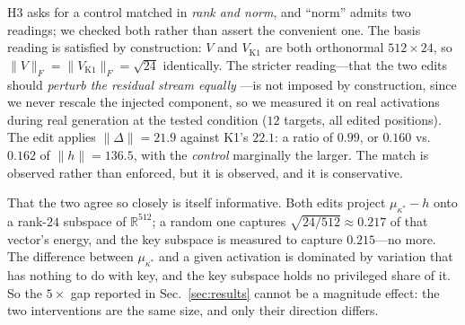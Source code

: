 \documentclass[conference]{IEEEtran}
\makeatletter
\newcommand{\vs}{vs.\@\ }
\makeatother
\begin{document}
\noindent H3 asks for a control matched in \emph{rank and norm}, and ``norm'' admits two
readings; we checked both rather than assert the convenient one. The basis reading is
satisfied by construction: $V$ and $V_{\mathrm{K1}}$ are both orthonormal $512\times24$,
so $\lVert V\rVert_F = \lVert V_{\mathrm{K1}}\rVert_F = \sqrt{24}$ identically. The
stricter reading---that the two edits should \emph{perturb the residual stream equally}
---is not imposed by construction, since we never rescale the injected component, so we
measured it on real activations during real generation at the tested condition
($12$ targets, all edited positions). The edit applies
$\lVert\Delta\rVert = 21.9$ against K1's $22.1$: a ratio of $0.99$, or $0.160$ \vs
$0.162$ of $\lVert h\rVert = 136.5$, with the \emph{control} marginally the larger. The
match is observed rather than enforced, but it is observed, and it is conservative.

That the two agree so closely is itself informative. Both edits project
$\mu_{\kappa^{*}}\!-\!h$ onto a rank-$24$ subspace of $\mathbb{R}^{512}$; a random one
captures $\sqrt{24/512}\approx0.217$ of that vector's energy, and the key subspace is
measured to capture $0.215$---no more. The difference between $\mu_{\kappa^{*}}$ and a
given activation is dominated by variation that has nothing to do with key, and the key
subspace holds no privileged share of it. So the $5\times$ gap reported in
Sec.~\ref{sec:results} cannot be a magnitude effect: the two interventions are the same
size, and only their direction differs.
\end{document}
